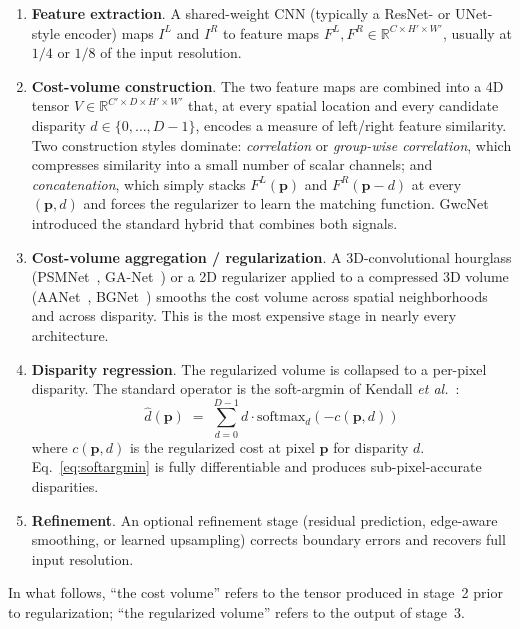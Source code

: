 \begin{enumerate}
\item \textbf{Feature extraction}. A shared-weight CNN (typically a ResNet- or UNet-style encoder) maps $I^L$ and $I^R$ to feature maps $F^L, F^R \in \mathbb{R}^{C \times H' \times W'}$, usually at $1/4$ or $1/8$ of the input resolution.
\item \textbf{Cost-volume construction}. The two feature maps are combined into a 4D tensor $V \in \mathbb{R}^{C' \times D \times H' \times W'}$ that, at every spatial location and every candidate disparity $d \in \{0, \ldots, D-1\}$, encodes a measure of left/right feature similarity. Two construction styles dominate: \emph{correlation} or \emph{group-wise correlation}, which compresses similarity into a small number of scalar channels; and \emph{concatenation}, which simply stacks $F^L(\mathbf{p})$ and $F^R(\mathbf{p}-d)$ at every $(\mathbf{p}, d)$ and forces the regularizer to learn the matching function. GwcNet~\cite{guo2019gwcnet} introduced the standard hybrid that combines both signals.
\item \textbf{Cost-volume aggregation / regularization}. A 3D-convolutional hourglass (PSMNet~\cite{chang2018psmnet}, GA-Net~\cite{zhang2019ganet}) or a 2D regularizer applied to a compressed 3D volume (AANet~\cite{xu2020aanet}, BGNet~\cite{xu2021bgnet}) smooths the cost volume across spatial neighborhoods and across disparity. This is the most expensive stage in nearly every architecture.
\item \textbf{Disparity regression}. The regularized volume is collapsed to a per-pixel disparity. The standard operator is the soft-argmin of Kendall \emph{et al.}~\cite{kendall2017gcnet}:
\begin{equation}
\hat{d}(\mathbf{p}) \;=\; \sum_{d=0}^{D-1} d \cdot \mathrm{softmax}_d\!\left(-c(\mathbf{p}, d)\right)
\label{eq:softargmin}
\end{equation}
where $c(\mathbf{p}, d)$ is the regularized cost at pixel $\mathbf{p}$ for disparity $d$. Eq.~\eqref{eq:softargmin} is fully differentiable and produces sub-pixel-accurate disparities.
\item \textbf{Refinement}. An optional refinement stage (residual prediction, edge-aware smoothing, or learned upsampling) corrects boundary errors and recovers full input resolution.
\end{enumerate}

In what follows, ``the cost volume'' refers to the tensor produced in stage~2 prior to regularization; ``the regularized volume'' refers to the output of stage~3.

